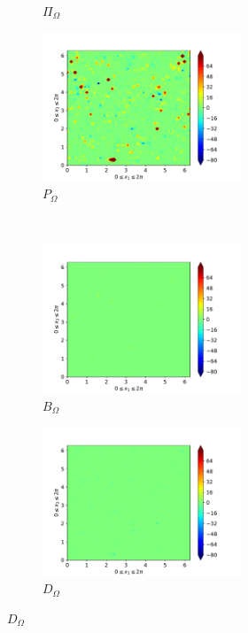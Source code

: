 \begin{figure}[H]
\begin{subfigure}{0.45\textwidth}
        \caption{$\Pi_{\Omega}$}
    \end{subfigure}
    \newline
    \begin{subfigure}{0.45\textwidth}
        \includegraphics[height=1.75in]{media/run-cds-65/P-enst-1400}
        \caption{$P_{\Omega}$}
    \end{subfigure}
    ~
    \begin{subfigure}{0.45\textwidth}
        \includegraphics[height=1.75in]{media/run-cds-65/B-enst-1400}
        \caption{$B_{\Omega}$}
    \end{subfigure}
    \newline
    \begin{subfigure}{0.45\textwidth}
        \includegraphics[height=1.75in]{media/run-cds-65/D-enst-1400}
        \caption{$D_{\Omega}$}
    \end{subfigure}
\end{figure}

\newpage

